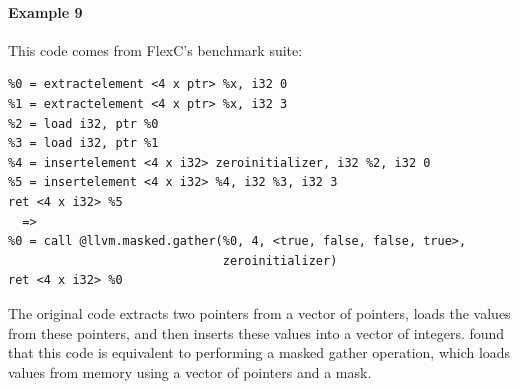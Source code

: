 \paragraph*{Example 9}

This code comes from FlexC's benchmark suite:

{\begin{quoting}\begin{Verbatim}
%0 = extractelement <4 x ptr> %x, i32 0
%1 = extractelement <4 x ptr> %x, i32 3
%2 = load i32, ptr %0
%3 = load i32, ptr %1
%4 = insertelement <4 x i32> zeroinitializer, i32 %2, i32 0
%5 = insertelement <4 x i32> %4, i32 %3, i32 3
ret <4 x i32> %5
  =>
%0 = call @llvm.masked.gather(%0, 4, <true, false, false, true>,
                              zeroinitializer)
ret <4 x i32> %0
\end{Verbatim}
\end{quoting}}

The original code extracts two pointers from a vector of pointers,
loads the values from these pointers, and then inserts these values
into a vector of integers. \minotaur{} found that this code is equivalent
to performing a masked gather operation, which loads values from
memory using a vector of pointers and a mask.